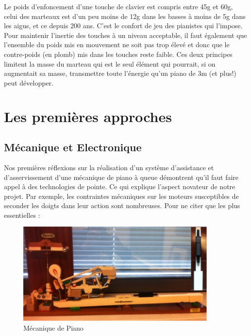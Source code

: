 \documentclass[french,a4paper,12pt]{report}
\begin{document}
Le poids d’enfoncement d’une touche de clavier est compris entre 45g et 60g, celui des marteaux est d’un peu moins de 12g dans les basses à moins de 5g dans les aigus, et ce depuis 200 ans. C’est le confort de jeu des pianistes qui l’impose. Pour maintenir l’inertie des touches à un niveau acceptable, il faut également que l’ensemble du poids mis en mouvement ne soit pas trop élevé et donc que le contre-poids (en plomb) mis dans les touches reste faible. Ces deux principes limitent la masse du marteau qui est le seul élément qui pourrait, si on augmentait sa masse, transmettre toute l’énergie qu’un piano de 3m (et plus!) peut développer.



\chapter{Les premières approches}

  \section{Mécanique et Electronique}
Nos premières réflexions sur la réalisation d’un système d’assistance et d’asservissement d’une mécanique de piano à queue démontrent qu’il faut faire appel à des technologies de pointe. Ce qui explique l’aspect novateur de notre projet. Par exemple, les contraintes mécaniques sur les moteurs susceptibles de seconder les doigts dans leur action sont nombreuses. Pour ne citer que les plus essentielles :\newline

	\begin{figure}[!ht]
    \center
    \includegraphics[width=10cm]{MECA_PIANO2.png}
    \caption{Mécanique de Piano}
	\end{figure} 

\end{document}
